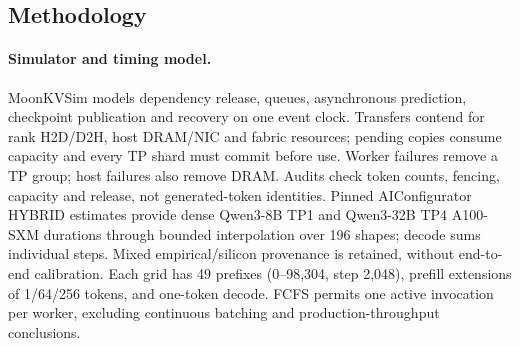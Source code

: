 
\subsection{Methodology}
\label{sec:eval-method}

\paragraph{Simulator and timing model.}
MoonKVSim models dependency release, queues, asynchronous prediction,
checkpoint publication and recovery on one event clock. Transfers contend for
rank H2D/D2H, host DRAM/NIC and fabric resources; pending copies consume capacity
and every TP shard must commit before use. Worker failures remove a TP group;
host failures also remove DRAM. Audits check token counts, fencing, capacity
and release, not generated-token identities.
Pinned AIConfigurator HYBRID estimates\cite{eval2026aiconfigurator} provide
dense Qwen3-8B TP1 and Qwen3-32B TP4 A100-SXM durations through bounded
interpolation over 196 shapes; decode sums individual steps. Mixed
empirical/silicon provenance is retained, without end-to-end calibration.
Each grid has 49 prefixes (0--98,304, step 2,048), prefill extensions of
1/64/256 tokens, and one-token decode.
FCFS permits one active invocation per worker, excluding continuous batching
and production-throughput conclusions.


